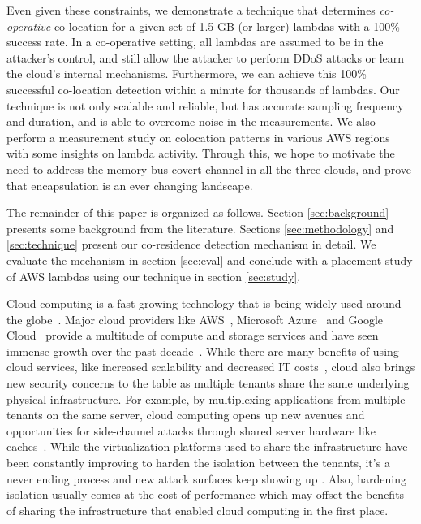 
Even given these constraints, we demonstrate a technique that determines
\emph{co-operative} co-location for a given set of 1.5 GB (or larger) lambdas
with a 100\% success rate.  In a co-operative setting, all lambdas are assumed
to be in the attacker's control, and still allow the attacker to perform DDoS
attacks or learn the cloud's internal mechanisms.  Furthermore, we can achieve
this 100\% successful co-location detection within a minute for thousands of
lambdas. Our technique is not only scalable and reliable, but has accurate
sampling frequency and duration, and is able to overcome noise in the
measurements.  We also perform a measurement study on colocation patterns in
various AWS regions with some insights on lambda activity.  Through this, we hope to motivate the need to address the
memory bus covert channel in all the three clouds, and prove that encapsulation
is an ever changing landscape.



The remainder of this paper is organized as follows. Section
\ref{sec:background} presents some background from the literature. Sections
\ref{sec:methodology} and \ref{sec:technique} present our co-residence detection
mechanism in detail. We evaluate the mechanism in section \ref{sec:eval} and
conclude with a placement study of AWS lambdas using our technique in section
\ref{sec:study}.  

Cloud computing is a fast growing technology that is being widely used 
around the globe~. Major cloud providers like AWS~\cite{awscloud}, 
Microsoft Azure~\cite{azurecloud} and Google Cloud~\cite{googlecloud} 
provide a multitude of compute and storage services and have seen 
immense growth over the past decade~. While there are many 
benefits of using cloud services, like increased scalability and 
decreased IT costs~\cite{Armbrust}, cloud also brings new security 
concerns to the table as multiple tenants share the same underlying 
physical infrastructure. 
For example, by multiplexing applications from multiple tenants on 
the same server, cloud computing opens up new avenues and opportunities 
for side-channel attacks through shared server hardware like 
caches~\cite{meltdown, xuccsw2011}. While the virtualization platforms 
used to share the infrastructure have been constantly improving to harden 
the isolation between the tenants, it's a never ending process and new 
attack surfaces keep showing up . Also, hardening isolation 
usually comes 
at the cost of performance which may offset the benefits of sharing 
the infrastructure that enabled cloud computing in the first place.


